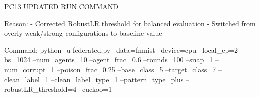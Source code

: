 PC13 UPDATED RUN COMMAND

Reason:
- Corrected RobustLR threshold for balanced evaluation
- Switched from overly weak/strong configurations to baseline value

Command:
python -u federated.py --data=fmnist --device=cpu --local_ep=2 --bs=1024 --num_agents=10 --agent_frac=0.6 --rounds=100 --snap=1 --num_corrupt=1 --poison_frac=0.25 --base_class=5 --target_class=7 --clean_label=1 --clean_label_type=1 --pattern_type=plus --robustLR_threshold=4 --cuckoo=1